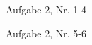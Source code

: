 \documentclass[main.tex]{subfiles}
\begin{document}
\begin{figure}[H]
    \caption{Aufgabe 2, Nr. 1-4}
    \label{fig:a1}
\end{figure}
\begin{figure}[H]
    \caption{Aufgabe 2, Nr. 5-6}
    \label{fig:a1}
\end{figure}
\end{document}

